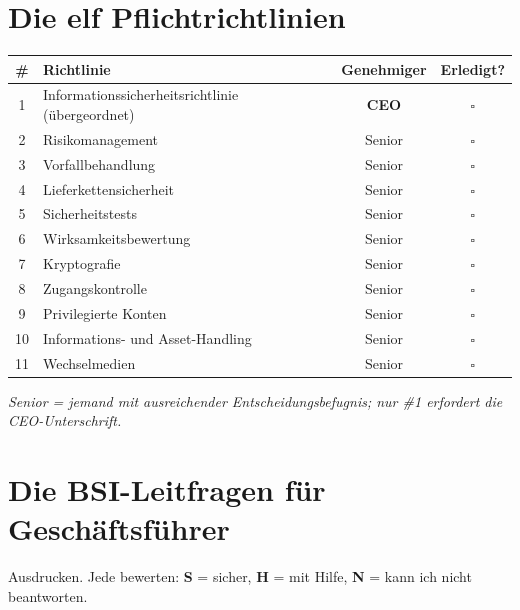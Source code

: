 \documentclass[11pt,a4paper,twoside]{book}
\begin{document}
\chapter{Die elf Pflichtrichtlinien}

\begin{center}
\renewcommand{\arraystretch}{1.4}
\begin{tabularx}{\linewidth}{@{}cXcc@{}}
\toprule
\textbf{\#} & \textbf{Richtlinie} & \textbf{Genehmiger} & \textbf{Erledigt?} \\
\midrule
1 & Informationssicherheitsrichtlinie (übergeordnet) & \textbf{CEO} & $\square$ \\
2 & Risikomanagement & Senior & $\square$ \\
3 & Vorfallbehandlung & Senior & $\square$ \\
4 & Lieferkettensicherheit & Senior & $\square$ \\
5 & Sicherheitstests & Senior & $\square$ \\
6 & Wirksamkeitsbewertung & Senior & $\square$ \\
7 & Kryptografie & Senior & $\square$ \\
8 & Zugangskontrolle & Senior & $\square$ \\
9 & Privilegierte Konten & Senior & $\square$ \\
10 & Informations- und Asset-Handling & Senior & $\square$ \\
11 & Wechselmedien & Senior & $\square$ \\
\bottomrule
\end{tabularx}
\end{center}

\textit{Senior = jemand mit ausreichender Entscheidungsbefugnis; nur \#1 erfordert die CEO-Unterschrift.}

\chapter{Die BSI-Leitfragen für Geschäftsführer}

Ausdrucken. Jede bewerten: \textbf{S} = sicher, \textbf{H} = mit Hilfe, \textbf{N} = kann ich nicht beantworten.
\end{document}
